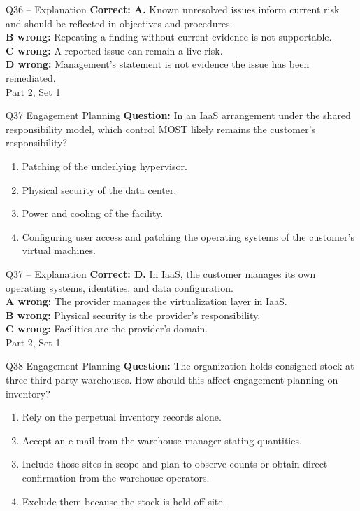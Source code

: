 \documentclass[aspectratio=169,10pt]{beamer}
\begin{document}
\begin{frame}[t]{Q36 -- Explanation}
	\footnotesize
	\textbf{Correct: A.} Known unresolved issues inform current risk and should be reflected in objectives and procedures. \\[5pt]
\textbf{B wrong:} Repeating a finding without current evidence is not supportable. \\[3pt]
\textbf{C wrong:} A reported issue can remain a live risk. \\[3pt]
\textbf{D wrong:} Management's statement is not evidence the issue has been remediated. \\[3pt]
	\vfill {\tiny Part 2, Set 1}
\end{frame}
\begin{frame}[t]{Q37 \hfill {\scriptsize Engagement Planning}}
	\small
	\textbf{Question:} In an IaaS arrangement under the shared responsibility model, which control MOST likely remains the customer's responsibility?
	\begin{enumerate}[label=\Alph*.,itemsep=1pt,topsep=3pt]
			\item Patching of the underlying hypervisor.
			\item Physical security of the data center.
			\item Power and cooling of the facility.
			\item Configuring user access and patching the operating systems of the customer's virtual machines.
	\end{enumerate}
\end{frame}
\begin{frame}[t]{Q37 -- Explanation}
	\footnotesize
	\textbf{Correct: D.} In IaaS, the customer manages its own operating systems, identities, and data configuration. \\[5pt]
\textbf{A wrong:} The provider manages the virtualization layer in IaaS. \\[3pt]
\textbf{B wrong:} Physical security is the provider's responsibility. \\[3pt]
\textbf{C wrong:} Facilities are the provider's domain. \\[3pt]
	\vfill {\tiny Part 2, Set 1}
\end{frame}
\begin{frame}[t]{Q38 \hfill {\scriptsize Engagement Planning}}
	\small
	\textbf{Question:} The organization holds consigned stock at three third-party warehouses. How should this affect engagement planning on inventory?
	\begin{enumerate}[label=\Alph*.,itemsep=1pt,topsep=3pt]
			\item Rely on the perpetual inventory records alone.
			\item Accept an e-mail from the warehouse manager stating quantities.
			\item Include those sites in scope and plan to observe counts or obtain direct confirmation from the warehouse operators.
			\item Exclude them because the stock is held off-site.
	\end{enumerate}
\end{frame}
\end{document}
